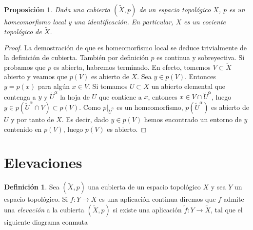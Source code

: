 \documentclass[12pt,a4paper]{book}
\newtheorem{prop}[thm]{Proposición}
\theoremstyle{definition} \newtheorem{defn}[thm]{Definición}
\theoremstyle{definition} \newtheorem{ejemplo}[thm]{Ejemplo}
\theoremstyle{definition} \newtheorem{ejercicio}[thm]{Ejercicio}
\theoremstyle{remark} \newtheorem*{obs}{Observación}
\def\XX{\tilde{X}}
\begin{document}
\begin{prop}
  Dada una cubierta $(\XX,p)$ de un espacio topológico $X$, $p$ es un homeomorfismo local y una identificación. En particular, $X$ es un cociente topológico de $\XX$.
\end{prop}
\begin{proof}
  La demostración de que es homeomorfismo local se deduce trivialmente de la definición de cubierta. También por definición $p$ es continua y sobreyectiva. Si probamos que $p$ es abierta, habremos terminado. En efecto, tomemos $V\subset \XX$ abierto y veamos que $p(V)$ es abierto de $X$. Sea $y\in p(V)$. Entonces $y=p(x)$ para algún $x\in V$. Si tomamos $U\subset X$ un abierto elemental que contenga a $y$ y $\tilde{U}^{\alpha}$ la hoja de $U$ que contiene a $x$, entonces $x\in V\cap \tilde{U}^{\alpha}$, luego $y\in p(\tilde{U}^{\alpha}\cap V)\subset p(V)$. Como $p|_{\tilde{U}^{\alpha}}$ es un homeomorfismo, $p(\tilde{U}^{\alpha})$ es abierto de $U$ y por tanto de $X$. Es decir, dado $y\in p(V)$ hemos encontrado un entorno de $y$ contenido en $p(V)$, luego $p(V)$ es abierto.
\end{proof}

\section{Elevaciones}
\begin{defn}
Sea $(\XX,p)$ una cubierta de un espacio topológico $X$ y sea $Y$ un espacio topológico. Si $f:Y\rightarrow X$ es una aplicación continua diremos que $f$ admite una \emph{elevación} a la cubierta $(\XX,p)$ si existe una aplicación $\tilde{f}:Y\rightarrow \XX$, tal que el siguiente diagrama conmuta
  \begin{center}
  \end{center}
\end{defn}
\end{document}
